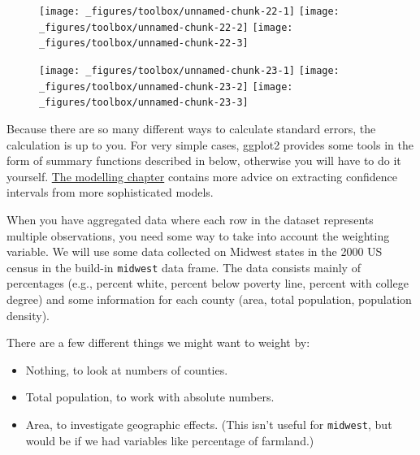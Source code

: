 \begin{figure}[H]
  \texttt{[image: \_figures/toolbox/unnamed-chunk-22-1]}%
  \texttt{[image: \_figures/toolbox/unnamed-chunk-22-2]}%
  \texttt{[image: \_figures/toolbox/unnamed-chunk-22-3]}
\end{figure}

\begin{Shaded}
\begin{Highlighting}[]
\StringTok{ }\NormalTok{()}
\StringTok{ }\NormalTok{()}
\StringTok{ }\NormalTok{()}
\end{Highlighting}
\end{Shaded}

\begin{figure}[H]
  \texttt{[image: \_figures/toolbox/unnamed-chunk-23-1]}%
  \texttt{[image: \_figures/toolbox/unnamed-chunk-23-2]}%
  \texttt{[image: \_figures/toolbox/unnamed-chunk-23-3]}
\end{figure}

Because there are so many different ways to calculate standard errors,
the calculation is up to you.  For very simple
cases, ggplot2 provides some tools in the form of summary functions
described in below, otherwise you will have to do it yourself.
\hyperref[cha:modelling]{The modelling chapter} contains more advice on
extracting confidence intervals from more sophisticated models.


When you have aggregated data where each row in the dataset represents
multiple observations, you need some way to take into account the
weighting variable. We will use some data collected on Midwest states in
the 2000 US census in the build-in \texttt{midwest} data frame. The data
consists mainly of percentages (e.g., percent white, percent below
poverty line, percent with college degree) and some information for each
county (area, total population, population density). 

There are a few different things we might want to weight by:

\begin{itemize}
\tightlist
\item
  Nothing, to look at numbers of counties.
\item
  Total population, to work with absolute numbers.
\item
  Area, to investigate geographic effects. (This isn't useful for
  \texttt{midwest}, but would be if we had variables like percentage of
  farmland.)
\end{itemize}

